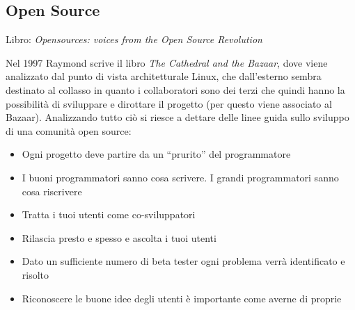 \subsection{Open Source}

Libro: \textit{Opensources: voices from the Open Source Revolution}

Nel 1997 Raymond scrive il libro \textit{The Cathedral and the Bazaar}, dove viene analizzato dal punto di vista architetturale Linux, che dall'esterno sembra destinato al collasso in quanto i collaboratori sono dei terzi che quindi hanno la possibilit\`a di sviluppare e dirottare il progetto (per questo viene associato al Bazaar). Analizzando tutto ci\`o si riesce a dettare delle linee guida sullo sviluppo di una comunit\`a open source:
\begin{itemize}

\item Ogni progetto deve partire da un ``prurito'' del programmatore
\item I buoni programmatori sanno cosa scrivere. I grandi programmatori sanno cosa riscrivere
\item Tratta i tuoi utenti come co-sviluppatori
\item Rilascia presto e spesso e ascolta i tuoi utenti
\item Dato un sufficiente numero di beta tester ogni problema verr\`a identificato e risolto
\item Riconoscere le buone idee degli utenti \`e importante come averne di proprie

\end{itemize}

